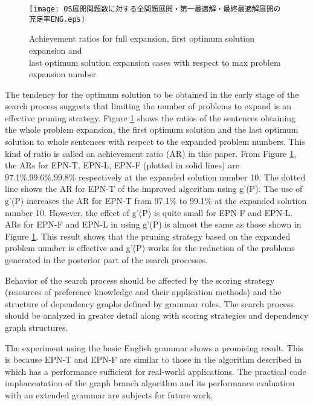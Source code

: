 \begin{figure}[bt]
\myfiglabelskippre
 \begin{center}
    \texttt{[image: OS展開問題数に対する全問題展開・第一最適解・最終最適解展開の充足率ENG.eps]}
 \end{center}
\myfiglabelskippre
\caption{Achievement ratios for full expansion, first optimum solution expansion and\\ last optimum solution expansion cases with respect to max problem expansion number}
\label{fig:AchivementRatioWRTMaxProblemExpansionNumber}
\myfiglabelskippre
\end{figure}

The tendency for the optimum solution to be obtained in the early
stage of the search process suggests that limiting the number of
problems to expand is an effective pruning
strategy. Figure \ref{fig:AchivementRatioWRTMaxProblemExpansionNumber}
shows the ratios of the sentences obtaining the whole problem
expansion, the first optimum solution and the last optimum solution to
whole sentences with respect to the expanded problem numbers. This
kind of ratio is called an achievement ratio (AR) in this paper. From
Figure \ref{fig:AchivementRatioWRTMaxProblemExpansionNumber}, the ARs
for EPN-T, EPN-L, EPN-F (plotted in solid lines) are
97.1\%,99.6\%,99.8\% respectively at the expanded solution number 10.
The dotted line shows the AR for EPN-T of the improved algorithm using
g'(P). The use of g'(P) increases the AR for EPN-T from 97.1\% to
99.1\% at the expanded solution number 10. However, the effect of
g'(P) is quite small for EPN-F and EPN-L. ARs for EPN-F and EPN-L in
using g'(P) is almost the same as those shown in
Figure \ref{fig:AchivementRatioWRTMaxProblemExpansionNumber}. This
result shows that the pruning strategy based on the expanded problem
number is effective and g'(P) works for the reduction of the problems
generated in the posterior part of the search processes.

Behavior of the search process should be affected by the scoring
strategy (resources of preference knowledge and their application
methods) and the structure of dependency graphs defined by grammar
rules. The search process should be analyzed in greater detail along
with scoring strategies and dependency graph structures. 

The experiment using the basic English grammar shows a promising
result. This is because EPN-T and EPN-F are similar to those in the
algorithm described in \cite{Hirakawa01} which has a performance
sufficient for real-world applications. The practical code
implementation of the graph branch algorithm and its performance
evaluation with an extended grammar are subjects for future work.





